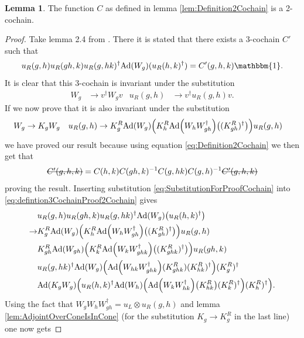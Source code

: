 \documentclass[12pt,a4paper,twoside]{article}
\newcommand{\stkout}[1]{\ifmmode\text{\sout{\ensuremath{#1}}}\else\sout{#1}\fi}
\let\originalleft\left
\let\originalright\right
\renewcommand{\left}{\mathopen{}\mathclose\bgroup\originalleft}
\renewcommand{\right}{\aftergroup\egroup\originalright}
\newcommand{\id}{\mathbbm{1}}
\newcommand{\Ad}[1]{\textrm{Ad}\left(#1\right)}
\theoremstyle{definition}
\newtheorem{lemma}[theorem]{Lemma}
\numberwithin{equation}{section}
\begin{document}
\begin{lemma}
	The function $C$ as defined in lemma \ref{lem:Definition2Cochain} is a 2-cochain.
\end{lemma}
\begin{proof}
	Take lemma 2.4 from \cite{ogata2021h3gmathbb}. There it is stated that there exists a 3-cochain $C'$ such that
	\begin{equation}\label{eq:defintion3CochainProof2Cochain}
		u_R(g,h)u_R(gh,k)u_R(g,hk)^\dagger\Ad{W_g}(u_R(h,k)^\dagger)=C'(g,h,k)\id.
	\end{equation}
	It is clear that this 3-cochain is invariant under the substitution
	\begin{align}
		W_g&\rightarrow v^\dagger W_g v&u_R(g,h)&\rightarrow v^\dagger u_R(g,h)v.
	\end{align}
	If we now prove that it is also invariant under the substitution
	\begin{align}\label{eq:SubstitutionForProofCochain}
		W_g&\rightarrow K_g W_g&u_R(g,h)&\rightarrow K_g^R\Ad{W_g}\left(K_h^R\Ad{W_hW_{gh}^\dagger}\left((K_{gh}^R)^\dagger\right)\right)u_
		R(g,h)
	\end{align}
	we have proved our result because using equation \eqref{eq:Definition2Cochain} we then get that
	\begin{equation}
		\stkout{C'(g,h,k)}=C(h,k)C(gh,k)^{-1}C(g,hk)C(g,h)^{-1}\stkout{C'(g,h,k)}
	\end{equation}
	proving the result. Inserting substitution \eqref{eq:SubstitutionForProofCochain} into \eqref{eq:defintion3CochainProof2Cochain} gives
	\begin{align}
		&u_R(g,h)u_R(gh,k)u_R(g,hk)^\dagger\Ad{W_g}\left(u_R(h,k)^\dagger\right)\\
		\rightarrow&K_g^R\Ad{W_g}\left(K_h^R\Ad{W_hW_{gh}^\dagger}\left((K_{gh}^R)^\dagger\right)\right)u_
		R(g,h)\\
		\nonumber
		&K_{gh}^R\Ad{W_{gh}}\left(K_k^R\Ad{W_kW_{ghk}^\dagger}\left((K_{ghk}^R)^\dagger\right)\right)u_
		R(gh,k)\\
		\nonumber
		&u_R(g,hk)^\dagger \Ad{W_g}\left( \Ad{W_{hk}W_{ghk}^\dagger}(K^R_{ghk})(K^R_{hk})^{\dagger} \right)(K^R_g)^\dagger\\
		\nonumber
		&\Ad{K_gW_g}\left(u_R(h,k)^\dagger \Ad{W_h}\left(\Ad{W_kW_{hk}^\dagger}\left(K_{hk}^R\right)(K^R_k)^\dagger\right)(K^R_h)^\dagger\right).
	\end{align}
	Using the fact that $W_gW_hW_{gh}^\dagger=u_L\otimes u_R(g,h)$ and lemma \ref{lem:AdjointOverConeIsInCone} (for the substitution $K_g\rightarrow K_g^R$ in the last line) one now gets

\end{proof}
\end{document}
